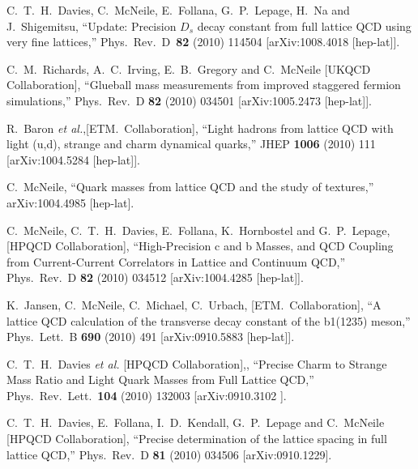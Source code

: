 \begin{thebibliography}{130}
  C.~T.~H.~Davies, C.~McNeile, E.~Follana, G.~P.~Lepage, H.~Na and
  J.~Shigemitsu,
  ``Update: Precision $D_s$ decay constant from full lattice QCD
  using very fine lattices,''
  Phys.\ Rev.\ D\ {\bf 82} (2010) 114504
  [arXiv:1008.4018 [hep-lat]].

  C.~M.~Richards, A.~C.~Irving, E.~B.~Gregory and C.~McNeile  [UKQCD
                  Collaboration],
  ``Glueball mass measurements from improved staggered fermion
  simulations,''
  Phys.\ Rev.\  D {\bf 82} (2010) 034501
  [arXiv:1005.2473 [hep-lat]].


  R.~Baron {\it et al.},[ETM.~Collaboration],
  ``Light hadrons from lattice QCD with light (u,d), strange and
  charm
  dynamical quarks,''
  JHEP {\bf 1006} (2010) 111
  [arXiv:1004.5284 [hep-lat]].



  C.~McNeile,
  ``Quark masses from lattice QCD and the study of textures,''
  arXiv:1004.4985 [hep-lat].

  C.~McNeile, C.~T.~H.~Davies, E.~Follana, K.~Hornbostel and
  G.~P.~Lepage, [HPQCD Collaboration],
  ``High-Precision c and b Masses, and QCD Coupling from
  Current-Current
  Correlators in Lattice and Continuum QCD,''
  Phys.\ Rev.\  D {\bf 82} (2010) 034512
  [arXiv:1004.4285 [hep-lat]].

  K.~Jansen, C.~McNeile, C.~Michael, C.~Urbach,
  [ETM.~Collaboration],
  ``A lattice QCD calculation of the transverse decay constant of the
  b1(1235)
  meson,''
  Phys.\ Lett.\  B {\bf 690} (2010) 491
  [arXiv:0910.5883 [hep-lat]].


  C.~T.~H.~Davies {\it et al.} [HPQCD Collaboration],,
``Precise Charm to Strange Mass Ratio and Light Quark Masses from
Full
Lattice QCD,''
  Phys.\ Rev.\ Lett.\  {\bf 104} (2010) 132003
  [arXiv:0910.3102 ].



  C.~T.~H.~Davies, E.~Follana, I.~D.~Kendall, G.~P.~Lepage and
  C.~McNeile
                  [HPQCD Collaboration],
  ``Precise determination of the lattice spacing in full lattice
  QCD,''
  Phys.\ Rev.\  D {\bf 81} (2010) 034506
  [arXiv:0910.1229].




\end{thebibliography}
